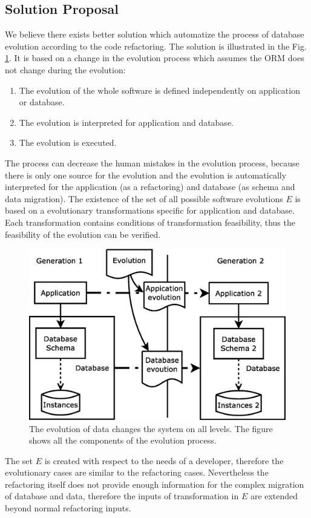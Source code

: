 \documentclass[runningheads]{comsis}
\begin{document}
\subsection{Solution Proposal}
We believe there exists better solution which automatize the process of database evolution according to the code refactoring. The solution is illustrated in the Fig. \ref{fig:evolution}. It is based on a change in the evolution process which assumes the ORM does not change during the evolution:
\begin{enumerate}
	\item The evolution of the whole software is defined independently on application or database.
	\item The evolution is interpreted for application and database.
	\item The evolution is executed.
\end{enumerate}
The process can decrease the human mistakes in the evolution process, because there is only one source for the evolution and the evolution is automatically interpreted for the application (as a refactoring) and database (as schema and data migration). The existence of the set of all possible software evolutions $E$ is based on a evolutionary transformations specific for application and database. Each transformation contains conditions of transformation feasibility, thus the feasibility of the evolution can be verified. 

\begin{figure}
\centering
	\includegraphics[width=.7\textwidth]{./images/evolution_simple}
	\caption{The evolution of data changes the system on all levels. The figure shows all the components of the evolution process.}
	\label{fig:evolution}
\end{figure}

The set $E$ is created with respect to the needs of a developer, therefore the evolutionary cases are similar to the refactoring cases. Nevertheless the refactoring itself does not provide enough information for the complex migration of database and data, therefore the inputs of transformation in $E$ are extended beyond normal refactoring inputs.
\end{document}
